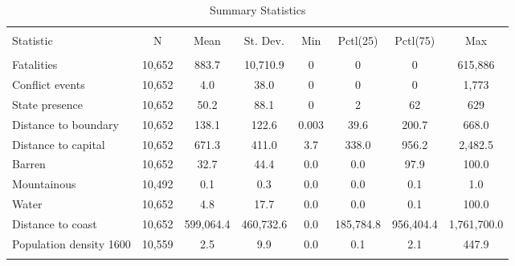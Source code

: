 
\begin{sidewaystable}[!htbp] \centering 
  \caption{Summary Statistics} 
  \label{summarystats} 
\begin{tabular}{@{\extracolsep{1pt}}lccccccc} 
\\[-1.8ex]\hline 
\hline \\[-1.8ex] 
Statistic & \multicolumn{1}{c}{N} & \multicolumn{1}{c}{Mean} & \multicolumn{1}{c}{St. Dev.} & \multicolumn{1}{c}{Min} & \multicolumn{1}{c}{Pctl(25)} & \multicolumn{1}{c}{Pctl(75)} & \multicolumn{1}{c}{Max} \\ 
\hline \\[-1.8ex] 
Fatalities & 10,652 & 883.7 & 10,710.9 & 0 & 0 & 0 & 615,886 \\ 
Conflict events & 10,652 & 4.0 & 38.0 & 0 & 0 & 0 & 1,773 \\ 
State presence & 10,652 & 50.2 & 88.1 & 0 & 2 & 62 & 629 \\ 
Distance to boundary & 10,652 & 138.1 & 122.6 & 0.003 & 39.6 & 200.7 & 668.0 \\ 
Distance to capital & 10,652 & 671.3 & 411.0 & 3.7 & 338.0 & 956.2 & 2,482.5 \\ 
Barren & 10,652 & 32.7 & 44.4 & 0.0 & 0.0 & 97.9 & 100.0 \\ 
Mountainous & 10,492 & 0.1 & 0.3 & 0.0 & 0.0 & 0.1 & 1.0 \\ 
Water & 10,652 & 4.8 & 17.7 & 0.0 & 0.0 & 0.1 & 100.0 \\ 
Distance to coast & 10,652 & 599,064.4 & 460,732.6 & 0.0 & 185,784.8 & 956,404.4 & 1,761,700.0 \\ 
Population density 1600 & 10,559 & 2.5 & 9.9 & 0.0 & 0.1 & 2.1 & 447.9 \\ 
\hline \\[-1.8ex] 
\end{tabular} 
\end{sidewaystable} 
